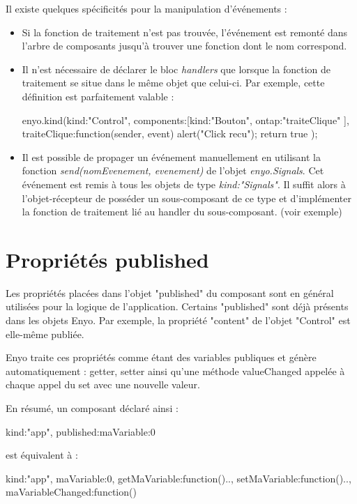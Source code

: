 \documentclass[11pt,a4paper]{report}
\begin{document}
Il existe quelques spécificités pour la manipulation d'événements :
\begin{itemize}
\item Si la fonction de traitement n'est pas trouvée, l'événement est remonté dans l'arbre de 
  composants jusqu'à trouver une fonction dont le nom correspond.
\item Il n'est nécessaire de déclarer le bloc \emph{handlers} que lorsque la fonction de traitement
  se situe dans le même objet que celui-ci. Par exemple, cette définition est parfaitement valable :
  \begin{JavaScript}
    enyo.kind({kind:"Control", 
               components:[{kind:"Bouton", 
                            ontap:"traiteClique"}
                          ],
               traiteClique:function(sender, event){
                 alert("Click recu"); return true
               }
    });
  \end{JavaScript}
\item Il est possible de propager un événement manuellement en utilisant la fonction 
  \emph{send(nomEvenement, evenement)} de l'objet \emph{enyo.Signals}. 
  Cet événement est remis à tous les objets de type \emph{kind:"Signals"}. Il suffit alors
  à l'objet-récepteur de posséder un sous-composant de ce type et d'implémenter la fonction de 
  traitement lié au handler du sous-composant. (voir exemple)
\end{itemize}

\section{Propriétés published}\label{sec:published}
Les propriétés placées dans l'objet "published" du composant sont en général utilisées pour
la logique de l'application. Certains "published" sont déjà présents dans les objets Enyo. 
Par exemple, la propriété "content" de l'objet "Control" est elle-même publiée.

Enyo traite ces propriétés comme étant des variables publiques et génère automatiquement : 
getter, setter ainsi qu'une méthode valueChanged appelée à chaque appel du set avec une nouvelle valeur.
\\\medskip

En résumé, un composant déclaré ainsi : 
\begin{JavaScript}
  {kind:"app", published:{maVariable:0}}
\end{JavaScript}
est équivalent à :
\begin{JavaScript}
  {kind:"app", maVariable:0, 
    getMaVariable:function(){..}, 
    setMaVariable:function(){..}, 
    maVariableChanged:function(){}}
\end{JavaScript}
\end{document}
